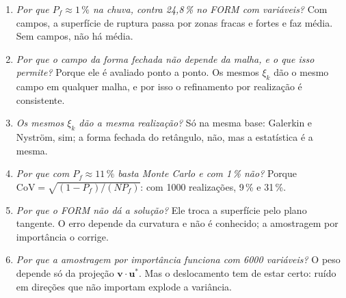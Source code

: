 \begin{enumerate}[label=\textbf{P\arabic*.}, leftmargin=2.2em]
    limitada por $k$. Com $k > I$, a água entra toda, mas drena rápido.
  \item \emph{Por que $P_f \approx 1\,\%$ na chuva, contra 24,8\,\% no FORM com variáveis?} Com campos, a superfície de
    ruptura passa por zonas fracas e fortes e faz média. Sem campos, não há média.
  \item \emph{Por que o campo da forma fechada não depende da malha, e o que isso permite?} Porque ele é avaliado ponto
    a ponto. Os mesmos $\xi_k$ dão o mesmo campo em qualquer malha, e por isso o refinamento por realização é
    consistente.
  \item \emph{Os mesmos $\xi_k$ dão a mesma realização?} Só na mesma base: Galerkin e Nyström, sim; a forma fechada do
    retângulo, não, mas a estatística é a mesma.
  \item \emph{Por que com $P_f \approx 11\,\%$ basta Monte Carlo e com 1\,\% não?} Porque
    $\mathrm{CoV} = \sqrt{(1 - P_f)/(NP_f)}$: com 1000 realizações, 9\,\% e 31\,\%.
  \item \emph{Por que o FORM não dá a solução?} Ele troca a superfície pelo plano tangente. O erro depende da curvatura
    e não é conhecido; a amostragem por importância o corrige.
  \item \emph{Por que a amostragem por importância funciona com 6000 variáveis?} O peso depende só da projeção
    $\bm v\cdot\bm u^*$. Mas o deslocamento tem de estar certo: ruído em direções que não importam explode a variância.
\end{enumerate}
